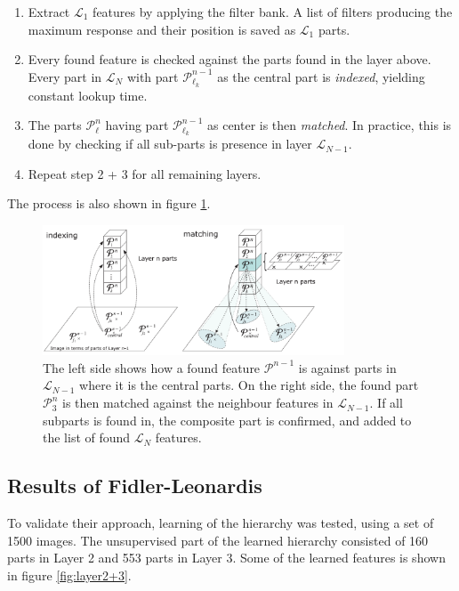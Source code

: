 \begin{enumerate}
	\item Extract $\mathcal{L}_1$ features by applying the filter bank. A list of filters producing the maximum response and their position is saved as $\mathcal{L}_1$ parts. 
	\item Every found feature is checked against the parts found in the layer above. 
	Every part in $\mathcal{L}_{N}$  with part $\mathcal{P}_{\ell_k}^{n-1}$ as the central part is \textit{indexed}, yielding constant lookup time. 
	\item The parts $\mathcal{P}_{\ell}^{n}$ having part $\mathcal{P}_{\ell_k}^{n-1}$ as center is then \textit{matched}. In practice, this is done by checking if all sub-parts is presence in layer $\mathcal{L}_{N-1}$.
	\item Repeat step 2 + 3 for all remaining layers.  
\end{enumerate}

The process is also shown in figure \ref{fig:indexing-matching}. 
\begin{figure}[h!] %
\centering
\includegraphics[width=0.8\textwidth]{graphics/indexing-matching}
\caption{The left side shows how a found feature $\mathcal{P}^{n-1}$ is against parts in $\mathcal{L}_{N-1}$ where it is the central parts. 
On the right side, the found part $\mathcal{P}_{3}^{n}$ is then matched against the neighbour features in $\mathcal{L}_{N-1}$. 
If all subparts is found in, the composite part is confirmed, and added to the list of found $\mathcal{L}_{N}$ features. \\
\cite[fig.~3]{fidler2009learning} }
\label{fig:indexing-matching}
\end{figure}

\subsection{Results of Fidler-Leonardis}
\label{sec:fidler-results}
To validate their approach, learning of the hierarchy was tested, using a set of 1500 images. 
The unsupervised part of the learned hierarchy consisted of 160 parts in Layer 2 and 553 parts in Layer 3. 
Some of the learned features is shown in figure \ref{fig:layer2+3}. 

